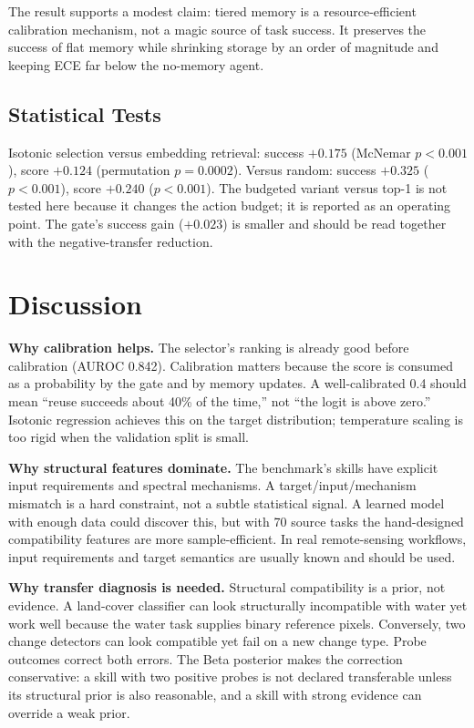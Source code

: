 \documentclass[journal]{IEEEtran}
\begin{document}
The result supports a modest claim: tiered memory is a resource-efficient calibration mechanism, not a magic source of task success. It preserves the success of flat memory while shrinking storage by an order of magnitude and keeping ECE far below the no-memory agent.

\subsection{Statistical Tests}

Isotonic selection versus embedding retrieval: success $+0.175$ (McNemar $p<0.001$), score $+0.124$ (permutation $p=0.0002$). Versus random: success $+0.325$ ($p<0.001$), score $+0.240$ ($p<0.001$). The budgeted variant versus top-1 is not tested here because it changes the action budget; it is reported as an operating point. The gate's success gain ($+0.023$) is smaller and should be read together with the negative-transfer reduction.

\section{Discussion}

\textbf{Why calibration helps.} The selector's ranking is already good before calibration (AUROC 0.842). Calibration matters because the score is consumed as a probability by the gate and by memory updates. A well-calibrated 0.4 should mean ``reuse succeeds about 40\% of the time,'' not ``the logit is above zero.'' Isotonic regression achieves this on the target distribution; temperature scaling is too rigid when the validation split is small.

\textbf{Why structural features dominate.} The benchmark's skills have explicit input requirements and spectral mechanisms. A target/input/mechanism mismatch is a hard constraint, not a subtle statistical signal. A learned model with enough data could discover this, but with 70 source tasks the hand-designed compatibility features are more sample-efficient. In real remote-sensing workflows, input requirements and target semantics are usually known and should be used.

\textbf{Why transfer diagnosis is needed.} Structural compatibility is a prior, not evidence. A land-cover classifier can look structurally incompatible with water yet work well because the water task supplies binary reference pixels. Conversely, two change detectors can look compatible yet fail on a new change type. Probe outcomes correct both errors. The Beta posterior makes the correction conservative: a skill with two positive probes is not declared transferable unless its structural prior is also reasonable, and a skill with strong evidence can override a weak prior.
\end{document}

